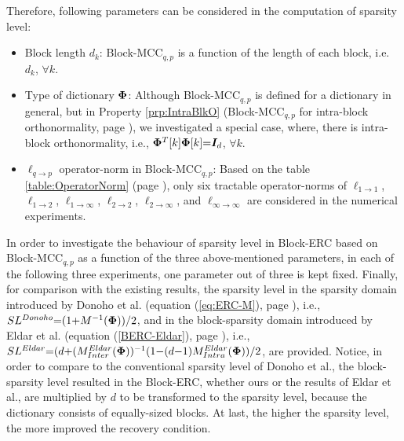 Therefore, 
following parameters can be considered in the computation of sparsity level: 
\begin{itemize}
\item Block length $d_k$: Block-MCC$_{q,p}$ is a function of the length of each block, i.e. $d_k$, $\forall k$.
\item Type of dictionary $\boldsymbol{\Phi}$: Although Block-MCC$_{q,p}$ is defined for a dictionary in general, but in Property \ref{prp:IntraBlkO} (Block-MCC$_{q,p}$ for intra-block orthonormality, page \pageref{prp:IntraBlkO}), we investigated a special case, where, there is intra-block orthonormality, i.e.,  $\boldsymbol{\Phi}^T[k] \boldsymbol{\Phi}[k] {=} \boldsymbol{I}_d$, $\forall k$.
\item $\ell_{q {\to} p}$ operator-norm in Block-MCC$_{q,p}$: Based on the table \ref{table:OperatorNorm} (page \pageref{table:OperatorNorm}), only six tractable operator-norms of $\ell_{1 {\to} 1}$, $\ell_{1 {\to} 2}$, $\ell_{1 {\to} \infty}$, $\ell_{2 {\to} 2}$, $\ell_{2 {\to} \infty}$, and $\ell_{\infty {\to} \infty}$ are considered in the numerical experiments.
\end{itemize}
In order to investigate the behaviour of sparsity level in Block-ERC based on Block-MCC$_{q,p}$ as a function of the three above-mentioned parameters, in each of the following three experiments, one parameter out of three is kept fixed. 
Finally, for comparison with the existing results, the sparsity level in the sparsity domain introduced by Donoho et al. (equation (\ref{eq:ERC-M}), page \pageref{eq:ERC-M}), i.e., $SL^{Donoho} {=} (1 {+} M^{-1}(\boldsymbol{\Phi})) / 2$, and in the block-sparsity domain introduced by Eldar et al. (equation (\ref{BERC-Eldar}), page \pageref{BERC-Eldar}), i.e., $SL^{Eldar} {=} (d {+} (M^{Eldar}_{Inter} (\boldsymbol{\Phi}))^{-1} (1 {-} (d {-} 1)M^{Eldar}_{Intra}(\boldsymbol{\Phi})) / 2$, are provided. 
Notice, in order to compare to the conventional sparsity level of Donoho et al., the block-sparsity level resulted in the Block-ERC, whether ours or the results of Eldar et al., are multiplied by $d$ to be transformed to the sparsity level, because the dictionary consists of equally-sized blocks.
At last, the higher the sparsity level, the more improved the recovery condition.
